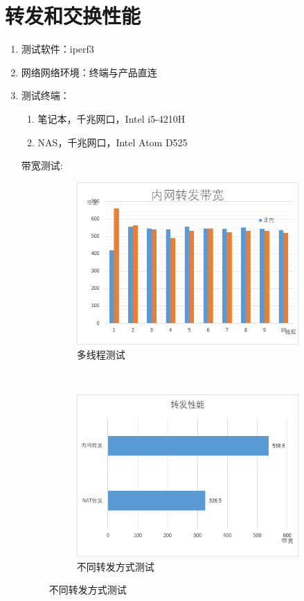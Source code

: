 \documentclass{itecreport-zh}
\begin{document}
\section{转发和交换性能}
  \begin{enumerate}
    \item 测试软件：iperf3
    \item 网络网络环境：终端与产品直连
    \item 测试终端：
      \begin{enumerate}
        \item 笔记本，千兆网口，Intel i5-4210H
        \item NAS，千兆网口，Intel Atom D525
      \end{enumerate}

      带宽测试:
      \begin{figure}[!h]
      \centering
        \begin{subfigure}[b]{0.5\textwidth}
        \includegraphics[width=\textwidth]{multhreadtest.png}
        \caption{多线程测试}
        \end{subfigure}
        ~
        \begin{subfigure}[b]{0.4\textwidth}
        \includegraphics[width=\textwidth]{test.png}
        \caption{不同转发方式测试}
        \end{subfigure}
      \end{figure}
      


\end{enumerate}
\end{document}
